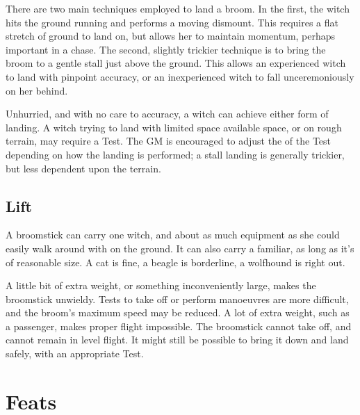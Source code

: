 There are two main techniques employed to land a broom.
In the first, the witch hits the ground running and performs a moving dismount.
This requires a flat stretch of ground to land on, but allows her to maintain momentum, perhaps important in a chase.
The second, slightly trickier technique is to bring the broom to a gentle stall just above the ground.
This allows an experienced witch to land with pinpoint accuracy, or an inexperienced witch to fall unceremoniously on her behind.

Unhurried, and with no care to accuracy, a witch can achieve either form of landing.
A witch trying to land with limited space available space, or on rough terrain, may require a Test.
The GM is encouraged to adjust the {\tn} of the Test depending on how the landing is performed; a stall landing is generally trickier, but less dependent upon the terrain.

\subsection{Lift}

A broomstick can carry one witch, and about as much equipment as she could easily walk around with on the ground.
It can also carry a familiar, as long as it's of reasonable size.
A cat is fine, a beagle is borderline, a wolfhound is right out.

A little bit of extra weight, or something inconveniently large, makes the broomstick unwieldy.
Tests to take off or perform manoeuvres are more difficult, and the broom's maximum speed may be reduced.
A lot of extra weight, such as a passenger, makes proper flight impossible.
The broomstick cannot take off, and cannot remain in level flight.
It might still be possible to bring it down and land safely, with an appropriate Test.



\section{Feats}


